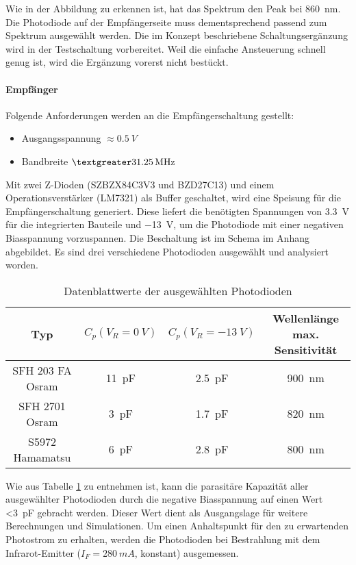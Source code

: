 Wie in der Abbildung zu erkennen ist, hat das Spektrum den Peak bei \SI{860}{nm}. Die Photodiode auf der Empfängerseite muss dementsprechend passend zum Spektrum ausgewählt werden. Die im Konzept beschriebene Schaltungsergänzung wird in der Testschaltung vorbereitet. Weil die einfache Ansteuerung schnell genug ist, wird die Ergänzung vorerst nicht bestückt.

\paragraph{Empfänger}
Folgende Anforderungen werden an die Empfängerschaltung gestellt:
\begin{itemize}
	\item Ausgangsspannung $\approx \SI{0.5}{V}$
	\item Bandbreite $\textgreater \SI{31.25}{MHz}$
\end{itemize}
Mit zwei Z-Dioden (SZBZX84C3V3 und BZD27C13) und einem Operationsverstärker (LM7321) als Buffer geschaltet, wird eine Speisung für die Empfängerschaltung generiert. Diese liefert die benötigten Spannungen von \SI{3.3}{V} für die integrierten Bauteile und \SI{-13}{V}, um die Photodiode mit einer negativen Biasspannung vorzuspannen. Die Beschaltung ist im Schema im Anhang abgebildet.
\newline
Es sind drei verschiedene Photodioden ausgewählt und analysiert worden.

\begin{table}[H]
\begin{tabular}{c|c|c|c}
	\normalfont\textbf{Typ}&\normalfont\textbf{$C_{p} (V_{R}=\SI{0}{V})$}  & \normalfont\textbf{$C_{p} (V_{R}=\SI{-13}{V})$} & \normalfont\textbf{Wellenlänge max. Sensitivität} \\ \hline\hline
	SFH 203 FA Osram&\SI{11}{pF}  & \SI{2.5}{pF} & \SI{900}{nm} \\ 
	\hline 
	SFH 2701 Osram&\SI{3}{pF}  &\SI{1.7}{pF}  &\SI{820}{nm}  \\ 
	\hline 
	S5972 Hamamatsu&\SI{6}{pF}  &\SI{2.8}{pF}  &\SI{800}{nm}  \\ 
	\hline 
\end{tabular} 
\caption{Datenblattwerte der ausgewählten Photodioden}\label{tab:Tabelle_Photo}
\end{table}

Wie aus Tabelle \ref{tab:Tabelle_Photo} zu entnehmen ist, kann die parasitäre Kapazität aller ausgewählter Photodioden durch die negative Biasspannung auf einen Wert \textless \SI{3}{pF} gebracht werden. Dieser Wert dient als Ausgangslage für weitere Berechnungen und Simulationen.
\newline
Um einen Anhaltspunkt für den zu erwartenden Photostrom zu erhalten, werden die Photodioden bei Bestrahlung mit dem Infrarot-Emitter ($I_{F}=\SI{280}{mA}$, konstant) ausgemessen.

